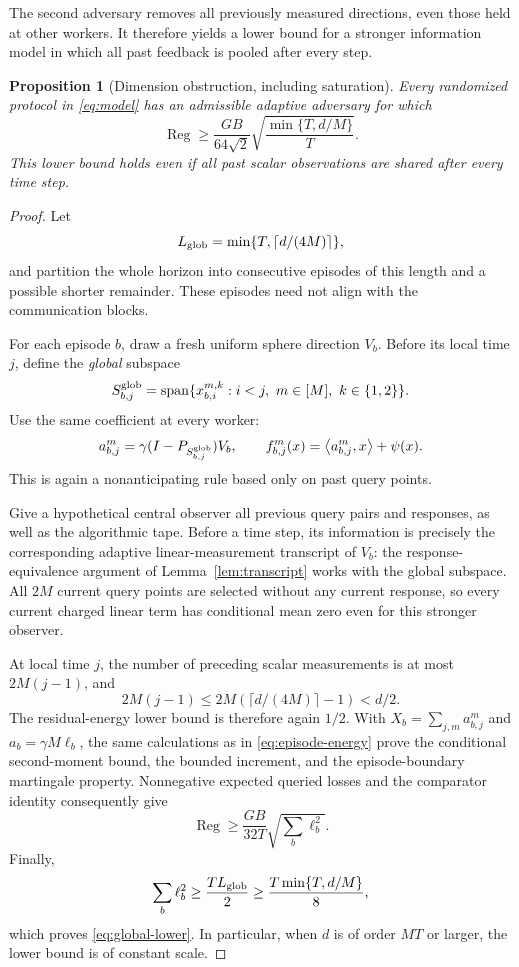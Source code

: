 \documentclass[11pt,a4paper]{article}
\numberwithin{equation}{section}
\newtheorem{proposition}[theorem]{Proposition}
\theoremstyle{remark}
\newcommand{\ip}[2]{\left\langle #1,#2\right\rangle}
\DeclareMathOperator{\spanop}{span}
\begin{document}
The second adversary removes all previously measured directions, even those held at other workers. It therefore yields a lower bound for a stronger information model in which all past feedback is pooled after every step.

\begin{proposition}[Dimension obstruction, including saturation]
\label{prop:global}
Every randomized protocol in \eqref{eq:model} has an admissible adaptive adversary for which
\begin{equation}
 \operatorname{Reg}\ge
 \frac{GB}{64\sqrt2}
 \sqrt{\frac{\min\{T,d/M\}}{T}}.
 \label{eq:global-lower}
\end{equation}
This lower bound holds even if all past scalar observations are shared
after every time step.
\end{proposition}
\begin{proof}
Let
\[
 L_{\rm glob}=\min\{T,\lceil d/(4M)\rceil\},
\]
and partition the whole horizon into consecutive episodes of this
length and a possible shorter remainder. These episodes need not align
with the communication blocks.

For each episode $b$, draw a fresh uniform sphere direction $V_b$.
Before its local time $j$, define the \emph{global} subspace
\[
 S_{b,j}^{\rm glob}
 =\spanop\{x_{b,i}^{m,k}:i<j,\ m\in[M],\ k\in\{1,2\}\}.
\]
Use the same coefficient at every worker:
\begin{equation}
 a_{b,j}^m=\gamma(I-P_{S_{b,j}^{\rm glob}})V_b,
 \qquad
 f_{b,j}^m(x)=\ip{a_{b,j}^m}{x}+\psi(x).
 \label{eq:global-adversary}
\end{equation}
This is again a nonanticipating rule based only on past query points.

Give a hypothetical central observer all previous query pairs and
responses, as well as the algorithmic tape. Before a time step, its
information is precisely the corresponding adaptive linear-measurement
transcript of $V_b$: the response-equivalence argument of
Lemma~\ref{lem:transcript} works with the global subspace.
All $2M$ current query points are selected without any current response,
so every current charged linear term has conditional mean zero even
for this stronger observer.

At local time $j$, the number of preceding scalar measurements is at most
$2M(j-1)$, and
\[
 2M(j-1)\le2M(\lceil d/(4M)\rceil-1)<d/2.
\]
The residual-energy lower bound is therefore again $1/2$.
With $X_b=\sum_{j,m}a_{b,j}^m$ and $a_b=\gamma M\ell_b$,
the same calculations as in \eqref{eq:episode-energy} prove the
conditional second-moment bound, the bounded increment, and the
episode-boundary martingale property. Nonnegative expected queried
losses and the comparator identity consequently give
\[
 \operatorname{Reg}\ge
 \frac{GB}{32T}\sqrt{\sum_b\ell_b^2}.
\]
Finally,
\[
 \sum_b\ell_b^2\ge\frac{TL_{\rm glob}}2
 \ge\frac{T\min\{T,d/M\}}8,
\]
which proves \eqref{eq:global-lower}. In particular, when $d$ is of
order $MT$ or larger, the lower bound is of constant scale.
\end{proof}
\end{document}
